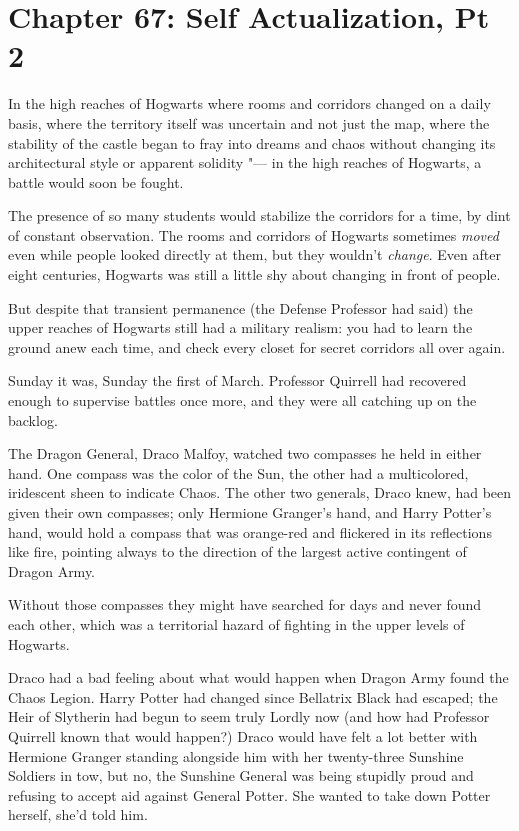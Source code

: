 \chapter{Chapter 67: Self Actualization, Pt 2}
In the high reaches of Hogwarts where rooms and corridors changed on a
daily basis, where the territory itself was uncertain and not just the
map, where the stability of the castle began to fray into dreams and
chaos without changing its architectural style or apparent solidity "--- in
the high reaches of Hogwarts, a battle would soon be fought.

The presence of so many students would stabilize the corridors for a
time, by dint of constant observation. The rooms and corridors of
Hogwarts sometimes \emph{moved} even while people looked directly at
them, but they wouldn't \emph{change}. Even after eight centuries,
Hogwarts was still a little shy about changing in front of people.

But despite that transient permanence (the Defense Professor had said)
the upper reaches of Hogwarts still had a military realism: you had to
learn the ground anew each time, and check every closet for secret
corridors all over again.

Sunday it was, Sunday the first of March. Professor Quirrell had
recovered enough to supervise battles once more, and they were all
catching up on the backlog.

The Dragon General, Draco Malfoy, watched two compasses he held in
either hand. One compass was the color of the Sun, the other had a
multicolored, iridescent sheen to indicate Chaos. The other two
generals, Draco knew, had been given their own compasses; only Hermione
Granger's hand, and Harry Potter's hand, would hold a compass that was
orange-red and flickered in its reflections like fire, pointing always
to the direction of the largest active contingent of Dragon Army.

Without those compasses they might have searched for days and never
found each other, which was a territorial hazard of fighting in the
upper levels of Hogwarts.

Draco had a bad feeling about what would happen when Dragon Army found
the Chaos Legion. Harry Potter had changed since Bellatrix Black had
escaped; the Heir of Slytherin had begun to seem truly Lordly now (and
how had Professor Quirrell known that would happen?) Draco would have
felt a lot better with Hermione Granger standing alongside him with her
twenty-three Sunshine Soldiers in tow, but no, the Sunshine General was
being stupidly proud and refusing to accept aid against General Potter.
She wanted to take down Potter herself, she'd told him.

